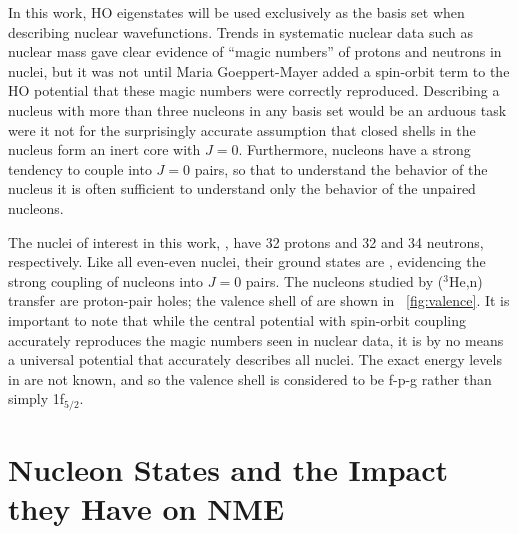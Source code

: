 In this work, HO eigenstates will be used exclusively as the basis set when describing nuclear wavefunctions.  Trends in systematic nuclear data such as nuclear mass gave clear evidence of ``magic numbers'' of protons and neutrons in nuclei, but it was not until Maria Goeppert-Mayer added a spin-orbit term to the HO potential that these magic numbers were correctly reproduced.  Describing a nucleus with more than three nucleons in any basis set would be an arduous task were it not for the surprisingly accurate assumption that closed shells in the nucleus form an inert core with $J=0$.  Furthermore, nucleons have a strong tendency to couple into $J=0$ pairs, so that to understand the behavior of the nucleus it is often sufficient to understand only the behavior of the unpaired nucleons.

The nuclei of interest in this work, \GeTargets, have 32 protons and 32 and 34 neutrons, respectively.  Like all even-even nuclei, their ground states are \zp, evidencing the strong coupling of nucleons into $J=0$ pairs.  The nucleons studied by ($^3$He,n) transfer are proton-pair holes; the valence shell of \GeTargets are shown in {\fig}~\ref{fig:valence}.  It is important to note that while the central potential with spin-orbit coupling accurately reproduces the magic numbers seen in nuclear data, it is by no means a universal potential that accurately describes all nuclei.  The exact energy levels in \GeTargets are not known, and so the valence shell is considered to be f-p-g rather than simply 1f$_{5/2}$.

\section{Nucleon States and the Impact they Have on NME}
